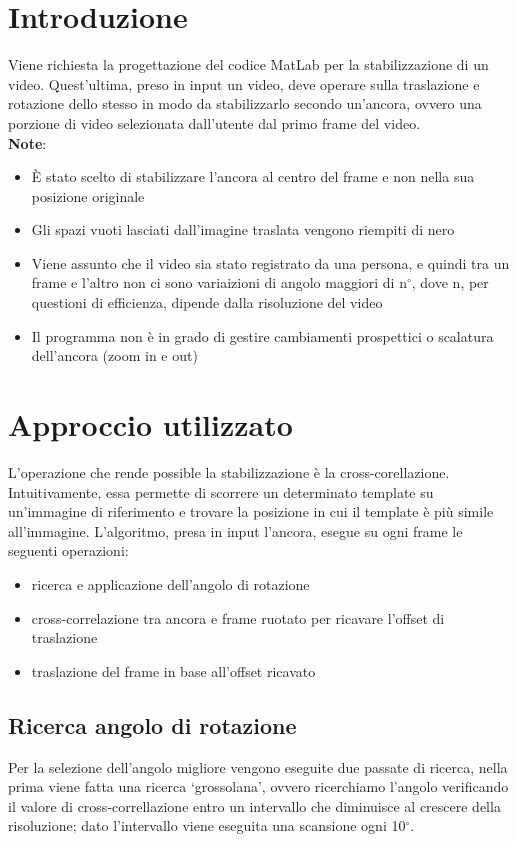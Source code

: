 \documentclass[12pt]{article}
\begin{document}
\section{Introduzione}
Viene richiesta la progettazione del codice MatLab per la stabilizzazione di un video. Quest'ultima, preso in input un video, deve operare sulla traslazione e rotazione dello stesso in modo da
stabilizzarlo secondo un'ancora, ovvero una porzione di video selezionata dall'utente dal primo frame del video.
\\
\textbf{Note}:
\begin{itemize}
\item È stato scelto di stabilizzare l'ancora al centro del frame e non nella sua posizione originale
\item Gli spazi vuoti lasciati dall'imagine traslata vengono riempiti di nero
\item Viene assunto che il video sia stato registrato da una persona, e quindi tra un frame e l'altro non ci sono variaizioni di angolo maggiori di n$^{\circ}$, dove n, per questioni di efficienza, dipende dalla risoluzione del video
\item Il programma non è in grado di gestire cambiamenti prospettici o scalatura dell'ancora (zoom in e out)
\end{itemize}

\clearpage
\section{Approccio utilizzato}
L'operazione che rende possible la stabilizzazione è la cross-corellazione. Intuitivamente, essa permette di scorrere un determinato template su un'immagine di riferimento e trovare la posizione in cui il template è più simile all'immagine.
L'algoritmo, presa in input l'ancora, esegue su ogni frame le seguenti operazioni:
\begin{itemize}
\item ricerca e applicazione dell'angolo di rotazione
\item cross-correlazione tra ancora e frame ruotato per ricavare l'offset di traslazione
\item traslazione del frame in base all'offset ricavato
\end{itemize}

\subsection{Ricerca angolo di rotazione}
Per la selezione dell'angolo migliore vengono eseguite due passate di ricerca, nella prima viene fatta una ricerca `grossolana', ovvero ricerchiamo l'angolo verificando il valore di cross-correllazione entro un intervallo che diminuisce al crescere della risoluzione; dato l'intervallo viene eseguita una scansione ogni 10$^{\circ}$.
\end{document}
